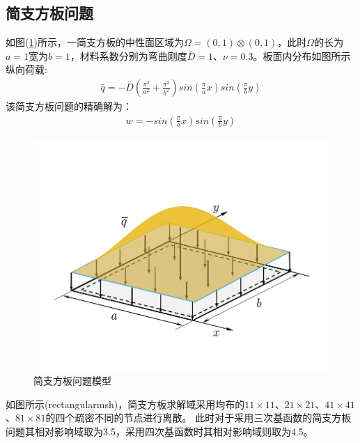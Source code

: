 \subsection{简支方板问题}
如图(\ref{rectangular})所示，一简支方板的中性面区域为$\Omega=(0,1)\otimes(0,1)$，此时$\Omega$的长为$a=1$宽为$b=1$，材料系数分别为弯曲刚度$\bar{D}=1$、$\nu=0.3$。板面内分布如图所示纵向荷载:
\begin{equation}
\begin{split}
    \bar q=-\bar D(\frac{\pi^2}{a^2}+\frac{\pi^2}{b^2})sin(\frac{\pi}{a}x)sin(\frac{\pi}{b}y)
\end{split}
\end{equation}
该简支方板问题的精确解为：
\begin{equation}
\begin{split}
    w=-sin(\frac{\pi}{a}x)sin(\frac{\pi}{b}y)
\end{split}
\end{equation}\par
\begin{figure}[!h]
\centering
\includegraphics[scale=0.7]{figure/P/R/rectangular.png}
\caption{简支方板问题模型}\label{rectangular}
\end{figure}
如图所示(rectangularmsh)，简支方板求解域采用均布的$11\times 11$、$21\times 21$、$41\times 41$、$81\times 81$的四个疏密不同的节点进行离散。
此时对于采用三次基函数的简支方板问题其相对影响域取为3.5，采用四次基函数时其相对影响域则取为4.5。\par
